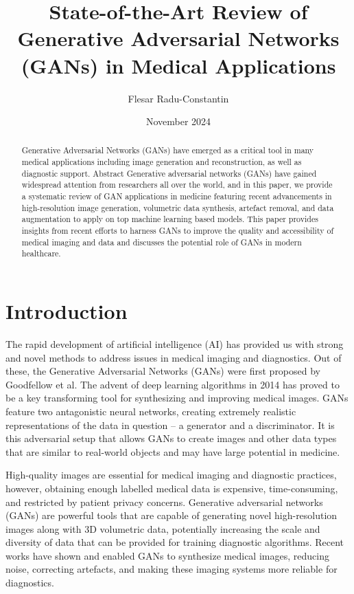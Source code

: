 \documentclass[12pt]{article}
\title{State-of-the-Art Review of Generative Adversarial Networks (GANs) in Medical Applications}
\author{Flesar Radu-Constantin}
\date{November 2024}
\begin{document}
\maketitle

\begin{abstract}
Generative Adversarial Networks (GANs) have emerged as a critical tool in many medical applications including image generation and reconstruction, as well as diagnostic support. Abstract Generative adversarial networks (GANs) have gained widespread attention from researchers all over the world, and in this paper, we provide a systematic review of GAN applications in medicine featuring recent advancements in high-resolution image generation, volumetric data synthesis, artefact removal, and data augmentation to apply on top machine learning based models. This paper provides insights from recent efforts to harness GANs to improve the quality and accessibility of medical imaging and data and discusses the potential role of GANs in modern healthcare.
\end{abstract}

\section{Introduction}

The rapid development of artificial intelligence (AI) has provided us with strong and novel methods to address issues in medical imaging and diagnostics. Out of these, the Generative Adversarial Networks (GANs) were first proposed by Goodfellow et al. The advent of deep learning algorithms in 2014 has proved to be a key transforming tool for synthesizing and improving medical images. GANs feature two antagonistic neural networks, creating extremely realistic representations of the data in question – a generator and a discriminator. It is this adversarial setup that allows GANs to create images and other data types that are similar to real-world objects and may have large potential in medicine.

High-quality images are essential for medical imaging and diagnostic practices, however, obtaining enough labelled medical data is expensive, time-consuming, and restricted by patient privacy concerns. Generative adversarial networks (GANs) are powerful tools that are capable of generating novel high-resolution images along with 3D volumetric data, potentially increasing the scale and diversity of data that can be provided for training diagnostic algorithms. Recent works have shown and enabled GANs to synthesize medical images, reducing noise, correcting artefacts, and making these imaging systems more reliable for diagnostics.
\end{document}
